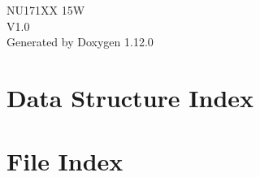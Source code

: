 \documentclass[twoside]{book}
\newcommand{\+}{\discretionary{\mbox{\scriptsize$\hookleftarrow$}}{}{}}
\newcommand{\clearemptydoublepage}{%
    \newpage{\pagestyle{empty}\cleardoublepage}%
  }
\begin{document}
  \raggedbottom
  \begin{titlepage}
  \vspace*{7cm}
  \begin{center}%
  {\Large NU171\+XX 15W}\\
  [1ex]\large V1.\+0 \\
  \vspace*{1cm}
  {\large Generated by Doxygen 1.12.0}\\
  \end{center}
  \end{titlepage}
  \clearemptydoublepage
  \tableofcontents
  \clearemptydoublepage

\chapter{Data Structure Index}

\chapter{File Index}

\end{document}
